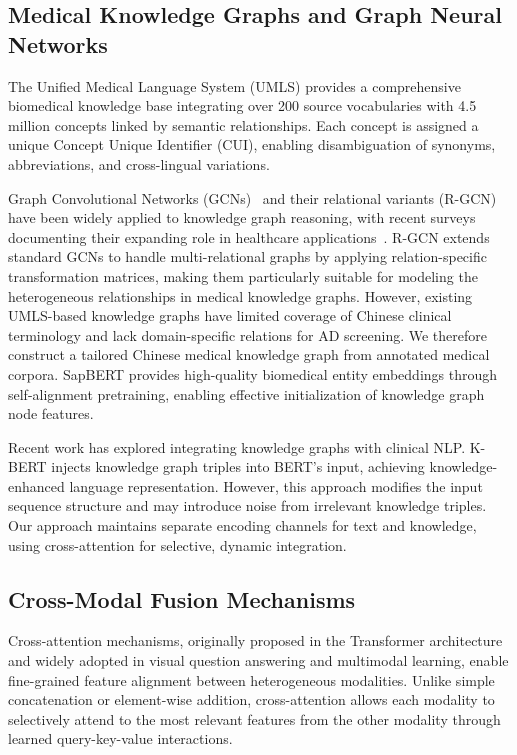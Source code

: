 \documentclass[11pt,onecolumn,a4paper]{article}
\begin{document}
\subsection{Medical Knowledge Graphs and Graph Neural Networks}

The Unified Medical Language System (UMLS) \cite{bodenreider2004} provides a comprehensive biomedical knowledge base integrating over 200 source vocabularies with 4.5 million concepts linked by semantic relationships. Each concept is assigned a unique Concept Unique Identifier (CUI), enabling disambiguation of synonyms, abbreviations, and cross-lingual variations.

Graph Convolutional Networks (GCNs)~\cite{kipf2017} and their relational variants (R-GCN)~\cite{schlichtkrull2018} have been widely applied to knowledge graph reasoning, with recent surveys documenting their expanding role in healthcare applications~\cite{zhang2024graph}. R-GCN extends standard GCNs to handle multi-relational graphs by applying relation-specific transformation matrices, making them particularly suitable for modeling the heterogeneous relationships in medical knowledge graphs. However, existing UMLS-based knowledge graphs have limited coverage of Chinese clinical terminology and lack domain-specific relations for AD screening. We therefore construct a tailored Chinese medical knowledge graph from annotated medical corpora. SapBERT \cite{liu2021sapbert} provides high-quality biomedical entity embeddings through self-alignment pretraining, enabling effective initialization of knowledge graph node features.

Recent work has explored integrating knowledge graphs with clinical NLP. K-BERT \cite{liu2020kbert} injects knowledge graph triples into BERT's input, achieving knowledge-enhanced language representation. However, this approach modifies the input sequence structure and may introduce noise from irrelevant knowledge triples. Our approach maintains separate encoding channels for text and knowledge, using cross-attention for selective, dynamic integration.

\subsection{Cross-Modal Fusion Mechanisms}

Cross-attention mechanisms, originally proposed in the Transformer architecture \cite{vaswani2017attention} and widely adopted in visual question answering and multimodal learning, enable fine-grained feature alignment between heterogeneous modalities. Unlike simple concatenation or element-wise addition, cross-attention allows each modality to selectively attend to the most relevant features from the other modality through learned query-key-value interactions.
\end{document}
